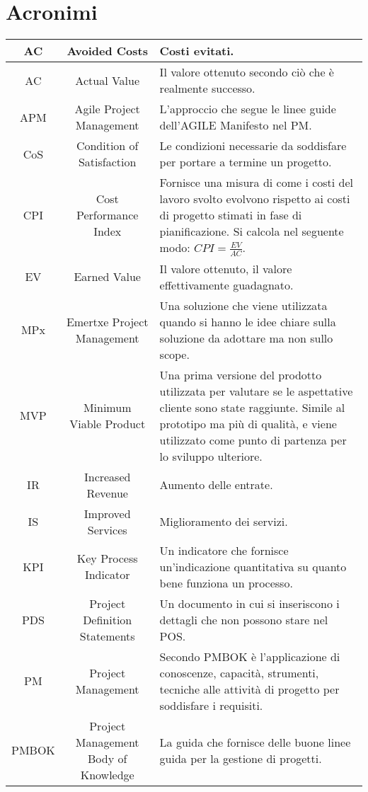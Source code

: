 \section{Acronimi}

\begin{tabularx}{\textwidth}{|c|c|X|}
	\hline
	AC & Avoided Costs & Costi evitati.\\
	\hline
	AC & Actual Value & Il valore ottenuto secondo ciò che è realmente successo.\\
	\hline
	APM & Agile Project Management & L'approccio che segue le linee guide dell'AGILE Manifesto nel PM.\\
	\hline
	CoS & Condition of Satisfaction & Le condizioni necessarie da soddisfare per portare a termine un progetto. \\
	\hline
	CPI & Cost Performance Index & Fornisce una misura di come i costi del lavoro svolto evolvono rispetto ai
	costi di progetto stimati in fase di pianificazione. Si calcola nel seguente modo: $CPI = \frac{EV}{AC}$.\\
	\hline
	EV & Earned Value & Il valore ottenuto, il valore effettivamente guadagnato.\\
	\hline
	MPx & Emertxe Project Management &
	Una soluzione che viene utilizzata quando si hanno le idee chiare sulla soluzione da adottare ma non sullo scope.\\
	\hline
	MVP & Minimum Viable Product & Una prima versione del prodotto utilizzata per valutare se le aspettative cliente sono state raggiunte. Simile al prototipo ma più di qualità, e viene utilizzato come punto di partenza per lo sviluppo ulteriore. \\
	\hline
	IR & Increased Revenue & Aumento delle entrate.\\
	\hline
	IS & Improved Services & Miglioramento dei servizi.\\
	\hline
	KPI & Key Process Indicator & Un indicatore che fornisce un'indicazione quantitativa su quanto bene funziona un processo. \\
	\hline
	PDS & Project Definition Statements & Un documento in cui si inseriscono i dettagli che non possono stare nel POS.\\
	\hline
	PM & Project Management & Secondo PMBOK è l'applicazione di conoscenze, capacità, strumenti, tecniche alle attività di progetto per soddisfare i requisiti.\\
	\hline
	PMBOK & Project Management Body of Knowledge & La guida che fornisce delle buone linee guida per la gestione di progetti.\\

\end{tabularx}
